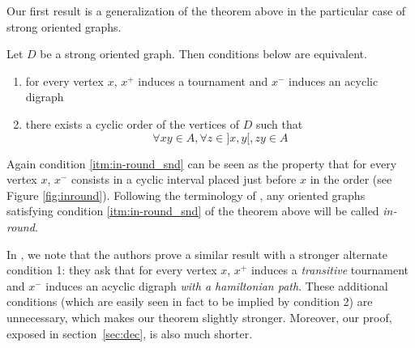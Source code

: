 Our first result is a generalization of the theorem above in the particular case of strong oriented graphs. 


\begin{inroundtheorem}

Let $D$ be a strong oriented graph. Then conditions below are equivalent.

\begin{enumerate}
    \item \label{itm:in-round_fst} for every vertex $x$, $x^+$ induces a tournament and $x^-$ induces an acyclic digraph 
    \item \label{itm:in-round_snd} there exists a cyclic order of the vertices of $D$ such that 
$$\forall xy\in A, \forall z\in ]x,y[, zy\in A$$
    

\end{enumerate}
\end{inroundtheorem}
Again condition \ref{itm:in-round_snd} can be seen as the property that for every vertex $x$, $x^-$ consists in a cyclic interval placed just before $x$ in the order (see Figure \ref{fig:inround}). Following the terminology of \cite{BG18}, any oriented graphs satisfying condition \ref{itm:in-round_snd} of the theorem above will be called {\em in-round}. 

In \cite{LZM08}, we note that the authors prove a similar result with a stronger alternate condition 1: they ask that for every vertex $x$, $x^+$ induces a {\em transitive} tournament and $x^-$ induces an acyclic digraph {\em with a hamiltonian path}. These additional conditions (which are easily seen in fact to be implied by condition 2) are unnecessary, which makes our theorem slightly stronger. Moreover, our proof, exposed in section~\ref{sec:dec}, is also much shorter.
 
